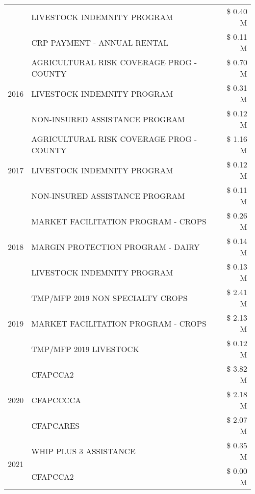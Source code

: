 \begin{tabular}{llr}
 & LIVESTOCK INDEMNITY PROGRAM & \$ 0.40 M \\
 & CRP PAYMENT - ANNUAL RENTAL & \$ 0.11 M \\
\cline{1-3}
\multirow[t]{3}{*}{2016} & AGRICULTURAL RISK COVERAGE PROG - COUNTY & \$ 0.70 M \\
 & LIVESTOCK INDEMNITY PROGRAM & \$ 0.31 M \\
 & NON-INSURED ASSISTANCE PROGRAM & \$ 0.12 M \\
\cline{1-3}
\multirow[t]{3}{*}{2017} & AGRICULTURAL RISK COVERAGE PROG - COUNTY & \$ 1.16 M \\
 & LIVESTOCK INDEMNITY PROGRAM & \$ 0.12 M \\
 & NON-INSURED ASSISTANCE PROGRAM & \$ 0.11 M \\
\cline{1-3}
\multirow[t]{3}{*}{2018} & MARKET FACILITATION PROGRAM - CROPS & \$ 0.26 M \\
 & MARGIN PROTECTION PROGRAM - DAIRY & \$ 0.14 M \\
 & LIVESTOCK INDEMNITY PROGRAM & \$ 0.13 M \\
\cline{1-3}
\multirow[t]{3}{*}{2019} & TMP/MFP 2019 NON SPECIALTY CROPS & \$ 2.41 M \\
 & MARKET FACILITATION PROGRAM - CROPS & \$ 2.13 M \\
 & TMP/MFP 2019 LIVESTOCK & \$ 0.12 M \\
\cline{1-3}
\multirow[t]{3}{*}{2020} & CFAPCCA2 & \$ 3.82 M \\
 & CFAPCCCCA & \$ 2.18 M \\
 & CFAPCARES & \$ 2.07 M \\
\cline{1-3}
\multirow[t]{2}{*}{2021} & WHIP PLUS 3 ASSISTANCE & \$ 0.35 M \\
 & CFAPCCA2 & \$ 0.00 M \\
\cline{1-3}
\bottomrule
\end{tabular}
